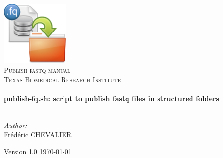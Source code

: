 \begin{titlepage}
\begin{center}

\includegraphics[width=0.25\textwidth]{Images/fastq.png}~\\[2.5cm]

\textsc{\LARGE Publish fastq manual}\\[1.5cm]

\textsc{\Large Texas Biomedical Research Institute}\\[0.5cm]

\HRule \\[0.4cm]
{ \huge \bfseries publish-fq.sh: script to publish fastq files in structured folders \\[0.4cm] }
\HRule \\[1.5cm]


\begin{center} \large
\emph{Author:} \\
Frédéric \textsc{CHEVALIER}
\end{center}


\vfill

Version 1.0
\hfill
\large \today

\end{center}
\end{titlepage}

